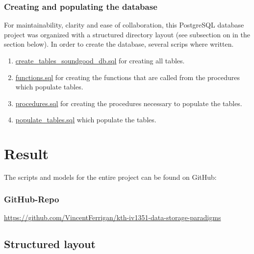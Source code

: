 \documentclass[a4paper]{scrartcl}
\begin{document}
\subsubsection*{Creating and populating the database}
For maintainability, clarity and ease of collaboration,
this PostgreSQL database project was organized with a structured directory layout
(see subsection on  in the  section below).
In order to create the database, several scrips where written.
\begin{enumerate}
  \item \href{https://github.com/VincentFerrigan/kth-iv1351-data-storage-paradigms/blob/main/src/tables/create_tables_soundgood_db.sql}{create\_tables\_soundgood\_db.sql}
  for creating all tables.
  \item \href{https://github.com/VincentFerrigan/kth-iv1351-data-storage-paradigms/blob/main/src/functions/functions.sql}{functions.sql}
  for creating the functions that are called from the procedures which populate tables.
  \item \href{https://github.com/VincentFerrigan/kth-iv1351-data-storage-paradigms/blob/main/src/procedures/procedures.sql}{procedures.sql}
  for creating the procedures necessary to populate the tables.
  \item \href{https://github.com/VincentFerrigan/kth-iv1351-data-storage-paradigms/blob/main/src/data/populate_tables.sql}{populate\_tables.sql}
  which populate the tables.
\end{enumerate}

\pagebreak
\section{Result}
\label{sec:result}
The scripts and models for the entire project can be found on GitHub:

\subsubsection*{GitHub-Repo}
\url{https://github.com/VincentFerrigan/kth-iv1351-data-storage-paradigms}

\subsection*{Structured layout}
\label{subsec:struturedlayout}
\end{document}
